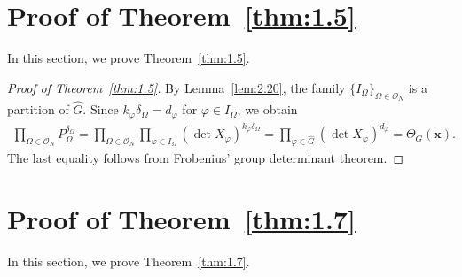 \documentclass[12pt,a4paper]{article}
\theoremstyle{definition}
\numberwithin{definition}{section}
\begin{document}
\section{Proof of Theorem~\ref{thm:1.5}}
In this section, we prove Theorem~\ref{thm:1.5}.

\begin{proof}[Proof of Theorem~\ref{thm:1.5}]
By Lemma~\ref{lem:2.20}, the family
$\{I_\Omega\}_{\Omega\in\mathcal O_N}$ is a partition of $\widehat G$.
Since $k_\varphi\delta_\Omega=d_\varphi$ for $\varphi\in I_\Omega$, we obtain
\[
\begin{aligned}
\prod_{\Omega\in\mathcal O_N}P_\Omega^{\delta_\Omega}
=
\prod_{\Omega\in\mathcal O_N}
\prod_{\varphi\in I_\Omega}
(\det X_\varphi)^{k_\varphi\delta_\Omega}
=
\prod_{\varphi\in\widehat G}(\det X_\varphi)^{d_\varphi}
=\Theta_G(\bm x).
\end{aligned}
\]
The last equality follows from Frobenius' group determinant theorem.
\end{proof}

\section{Proof of Theorem~\ref{thm:1.7}}
In this section, we prove Theorem~\ref{thm:1.7}.
\end{document}

